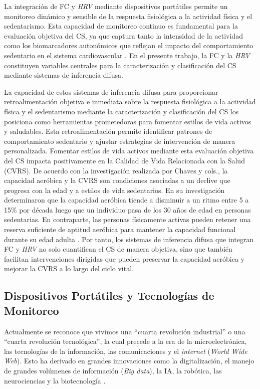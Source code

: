 La integración de FC y \textit{HRV} mediante dispositivos portátiles permite un monitoreo dinámico y sensible de la respuesta fisiológica a la actividad física y el sedentarismo. Esta capacidad de monitoreo continuo es fundamental para la evaluación objetiva del CS, ya que captura tanto la intensidad de la actividad como los biomarcadores autonómicos que reflejan el impacto del comportamiento sedentario en el sistema cardiovascular \cite{Bonneval2025Validity}. En el presente trabajo, la FC y la \textit{HRV} constituyen variables centrales para la caracterización y clasificación del CS mediante sistemas de inferencia difusa.

La capacidad de estos sistemas de inferencia difusa para proporcionar retroalimentación objetiva e inmediata sobre la respuesta fisiológica a la actividad física y el sedentarismo mediante la caracterización y clasificación del CS los posiciona como herramientas prometedoras para fomentar estilos de vida activos y saludables. Esta retroalimentación permite identificar patrones de comportamiento sedentario y ajustar estrategias de intervención de manera personalizada. Fomentar estilos de vida activos mediante esta evaluación objetiva del CS impacta positivamente en la Calidad de Vida Relacionada con la Salud (CVRS). De acuerdo con la investigación realizada por Chaves y cols., la capacidad aeróbica y la CVRS son condiciones asociadas a un declive que progresa con la edad y a estilos de vida sedentarios. En su investigación determinaron que la capacidad aeróbica tiende a disminuir a un ritmo entre 5 a 15\% por década luego que un individuo pasa de los 30 años de edad en personas sedentarias. En contraparte, las personas físicamente activas pueden retener una reserva suficiente de aptitud aeróbica para mantener la capacidad funcional durante su edad adulta \cite{Chaves2017Asociacion}. Por tanto, los sistemas de inferencia difusa que integran FC y \textit{HRV} no solo cuantifican el CS de manera objetiva, sino que también facilitan intervenciones dirigidas que pueden preservar la capacidad aeróbica y mejorar la CVRS a lo largo del ciclo vital.

\subsection{Dispositivos Portátiles y Tecnologías de Monitoreo}
\label{subsec:dispositivos_ia_cs}

Actualmente se reconoce que vivimos una ``cuarta revolución industrial'' o una ``cuarta revolución tecnológica'', la cual precede a la era de la microelectrónica, las tecnologías de la información, las comunicaciones y el \textit{internet} (\textit{World Wide Web}). Esto ha derivado en grandes innovaciones como la digitalización, el manejo de grandes volúmenes de información (\textit{Big data}), la IA, la robótica, las neurociencias y la biotecnología \cite{Martinez2020Revolucion}.

